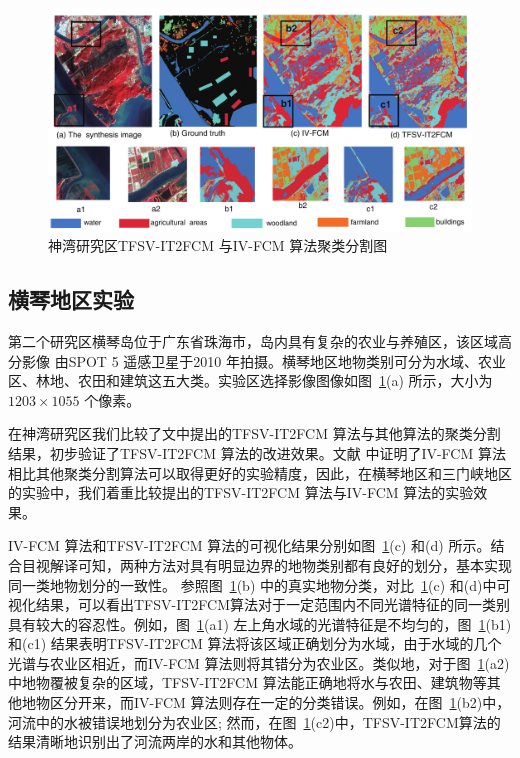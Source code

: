 \begin{figure}[htbp]
    \centering
    \includegraphics[width=1.0\textwidth]{figures/hengqin}
    \caption{神湾研究区TFSV-IT2FCM 与IV-FCM 算法聚类分割图 }\label{fig:hengqin}
\end{figure}

\subsection{横琴地区实验}
\label{subsec::chap03-4-1}
第二个研究区横琴岛位于广东省珠海市，岛内具有复杂的农业与养殖区，该区域高分影像
由SPOT 5 遥感卫星于2010 年拍摄。横琴地区地物类别可分为水域、农业区、林地、农田和建筑这五大类。实验区选择影像图像如图~\ref{fig:hengqin}(a) 所示，大小为$1203 \times 1055$ 个像素。

在神湾研究区我们比较了文中提出的TFSV-IT2FCM 算法与其他算法的聚类分割结果，初步验证了TFSV-IT2FCM 算法的改进效果。文献\cite{he2016remote} 中证明了IV-FCM 算法相比其他聚类分割算法可以取得更好的实验精度，因此，在横琴地区和三门峡地区的实验中，我们着重比较提出的TFSV-IT2FCM 算法与IV-FCM 算法的实验效果。

IV-FCM 算法和TFSV-IT2FCM 算法的可视化结果分别如图~\ref{fig:hengqin}(c) 和(d) 所示。结合目视解译可知，两种方法对具有明显边界的地物类别都有良好的划分，基本实现同一类地物划分的一致性。 参照图~\ref{fig:hengqin}(b) 中的真实地物分类，对比~\ref{fig:hengqin}(c) 和(d)中可视化结果，可以看出TFSV-IT2FCM算法对于一定范围内不同光谱特征的同一类别具有较大的容忍性。例如，图~\ref{fig:hengqin}(a1) 左上角水域的光谱特征是不均匀的，图~\ref{fig:hengqin}(b1) 和(c1) 结果表明TFSV-IT2FCM 算法将该区域正确划分为水域，由于水域的几个光谱与农业区相近，而IV-FCM 算法则将其错分为农业区。类似地，对于图~\ref{fig:hengqin}(a2)中地物覆被复杂的区域，TFSV-IT2FCM 算法能正确地将水与农田、建筑物等其他地物区分开来，而IV-FCM 算法则存在一定的分类错误。例如，在图~\ref{fig:hengqin}(b2)中，河流中的水被错误地划分为农业区; 然而，在图~\ref{fig:hengqin}(c2)中，TFSV-IT2FCM算法的结果清晰地识别出了河流两岸的水和其他物体。

